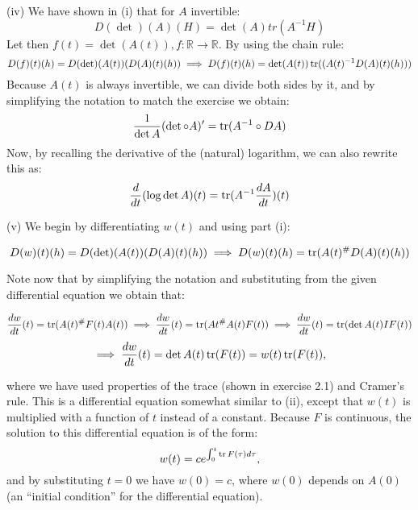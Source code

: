 \begin{solution}
    (iv) We have shown in (i) that for $A$ invertible:
    $$D(\det)(A)(H) = \det(A) tr(A^{-1}H)$$
    Let then $f(t) = \det(A(t)), f: \mathbb{R} \rightarrow \mathbb{R}$.
    By using the chain rule:
    $$D(f)(t)(h) = D(\det)(A(t))(D(A)(t)(h)) \implies D(f)(t)(h) = \det(A(t)) \operatorname{tr}((A(t)^{-1}D(A)(t)(h)))$$
    Because $A(t)$ is always invertible, we can divide both sides by it, and by simplifying the notation to match the exercise we obtain:
    $$\frac{1}{\det A}(\det \circ A)' = \operatorname{tr}(A^{-1} \circ DA)$$
    Now, by recalling the derivative of the (natural) logarithm, we can also rewrite this as:
    $$\frac{d}{dt}(\log \det A)(t) = \operatorname{tr}(A^{-1}\frac{dA}{dt})(t)$$

    (v) We begin by differentiating $w(t)$ and using part (i):

    $$D(w)(t)(h) = D(\det)(A(t))(D(A)(t)(h)) \implies D(w)(t)(h) = \operatorname{tr}(A(t)^{\#} D(A)(t)(h))$$

    Note now that by simplifying the notation and substituting from the given differential equation we obtain that:
    
    $$\frac{dw}{dt}(t) = \operatorname{tr}(A(t)^{\#} F(t)A(t)) \implies \frac{dw}{dt}(t)= \operatorname{tr}(A{t}^{\#}A(t)F(t)) \implies \frac{dw}{dt}(t) = \operatorname{tr}(\det A(t) I F(t)) $$
    $$\implies \frac{dw}{dt}(t) = \det A(t) \operatorname{tr}(F(t)) = w(t) \operatorname{tr}(F(t)),$$
    
    where we have used properties of the trace (shown in exercise 2.1) and Cramer's rule.
    This is a differential equation somewhat similar to (ii), except that $w(t)$ is multiplied with a function of $t$ instead of a constant.
    Because $F$ is continuous, the solution to this differential equation is of the form:
    $$w(t) = c e^{\int_{0}^{t} \operatorname{tr} F(\tau) d \tau},$$
    and by substituting $t = 0$ we have $w(0) = c$, where $w(0)$ depends on $A(0)$ (an ``initial condition'' for the differential equation).
\end{solution}